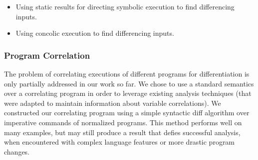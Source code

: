 \begin{itemize}
\item Using static results for directing symbolic execution to find differencing inputs.
\item Using concolic execution to find differencing inputs.
\end{itemize}


\subsubsection{Program Correlation}

The problem of correlating executions of different programs for differentiation is only partially addressed in our work so far. We chose to use a standard semantics over a correlating program in order to leverage existing analysis techniques (that were adapted to maintain information about variable correlations). We constructed our correlating program using a simple syntactic diff algorithm over imperative commands of normalized programs. This method performs well on many examples, but may still produce a result that defies successful analysis, when encountered with complex language features or more drastic program changes.

